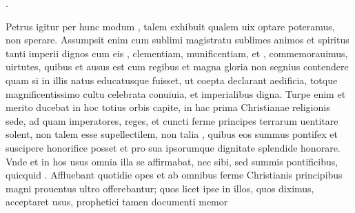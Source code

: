 \documentclass[a5paper,twoside]{article}
\begin{document}
.

Petrus igitur per hunc modum , talem  exhibuit qualem uix optare poteramus, non sperare. Assumpsit enim cum sublimi magistratu sublimes animos et spiritus tanti imperii  dignos  cum eis , clementiam, munificentiam, et ,  commemorauimus,  uirtutes, quibus et ausus est cum regibus et  magna gloria non segnius contendere quam si in illis natus educatusque fuisset, ut coepta  declarant aedificia, totque magnificentissimo cultu celebrata conuiuia, et  imperialibus  digna. Turpe enim et  merito ducebat in hoc totius orbis capite, in hac prima Christianae religionis sede, ad quam  imperatores, reges, et cuncti ferme principes terrarum uentitare solent, non talem esse supellectilem, non talia , quibus eos summus pontifex et suscipere honorifice posset et pro sua ipsorumque dignitate splendide honorare. Vnde et in hos usus omnia illa se  affirmabat, nec sibi, sed summis pontificibus, quicquid . Affluebant quotidie opes et ab omnibus ferme Christianis principibus magni prouentus ultro offerebantur; quos licet ipse in illos, quos diximus, acceptaret usus, prophetici tamen documenti memor 
\end{document}

